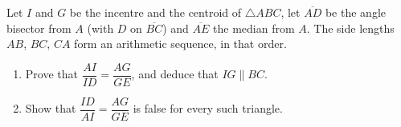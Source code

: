 Let $I$ and $G$ be the incentre and the centroid of $\triangle ABC$, let $\overline{AD}$ be the angle bisector from $A$ (with $D$ on $\overline{BC}$) and $\overline{AE}$ the median from $A$. The side lengths $AB$, $BC$, $CA$ form an arithmetic sequence, in that order.
\begin{enumerate}
\item[(a)] Prove that $\dfrac{AI}{ID}=\dfrac{AG}{GE}$, and deduce that $IG\parallel BC$.
\item[(b)] Show that $\dfrac{ID}{AI}=\dfrac{AG}{GE}$ is false for every such triangle.
\end{enumerate}
